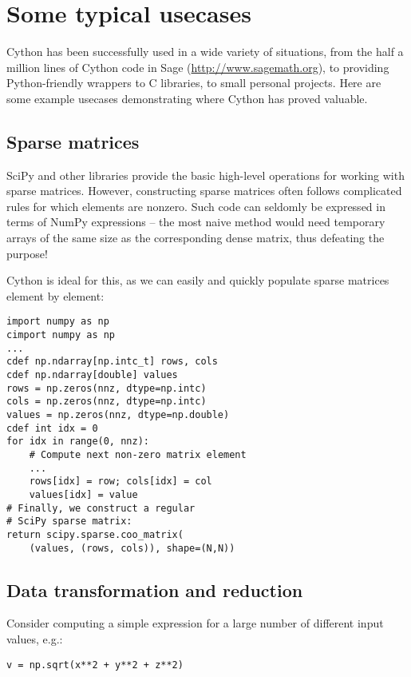 \documentclass[letterpaper,11pt,english]{article}
\begin{document}
\section{Some typical usecases}

Cython has been successfully used in a wide variety of situations,
from the half a million lines of Cython code in Sage
(\href{http://www.sagemath.org}{http://www.sagemath.org}), to providing Python-friendly wrappers to C
libraries, to small personal projects.  Here are some example usecases
demonstrating where Cython has proved valuable.


\subsection{Sparse matrices}

SciPy and other libraries provide the basic high-level operations for
working with sparse matrices. However, constructing sparse matrices
often follows complicated rules for which elements are nonzero. Such
code can seldomly be expressed in terms of NumPy expressions -- the
most naive method would need temporary arrays of the same size as the
corresponding dense matrix, thus defeating the purpose!

Cython is ideal for this, as we can easily and quickly
populate sparse matrices element by element:

\begin{verbatim}
import numpy as np
cimport numpy as np
...
cdef np.ndarray[np.intc_t] rows, cols
cdef np.ndarray[double] values
rows = np.zeros(nnz, dtype=np.intc)
cols = np.zeros(nnz, dtype=np.intc)
values = np.zeros(nnz, dtype=np.double)
cdef int idx = 0
for idx in range(0, nnz):
    # Compute next non-zero matrix element
    ...
    rows[idx] = row; cols[idx] = col
    values[idx] = value 
# Finally, we construct a regular
# SciPy sparse matrix:
return scipy.sparse.coo_matrix(
    (values, (rows, cols)), shape=(N,N))
\end{verbatim}


\subsection{Data transformation and reduction}

Consider computing a simple expression for a large number of different
input values, e.g.:

\begin{verbatim}
v = np.sqrt(x**2 + y**2 + z**2)
\end{verbatim}
\end{document}
